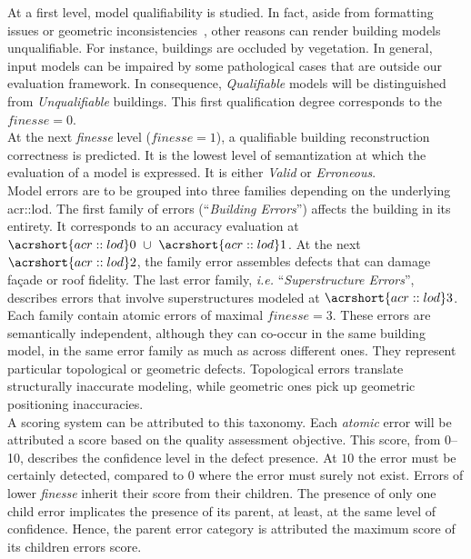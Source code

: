 \documentclass[runningheads]{llncs}
\begin{document}
At a first level, model qualifiability is studied. In fact, aside from formatting issues or geometric inconsistencies~\cite{ledoux2018val3dity}, other reasons can render building models unqualifiable. For instance, buildings are occluded by vegetation. In general, input models can be impaired by some pathological cases that are outside our evaluation framework. In consequence, \textit{Qualifiable} models will be distinguished from \textit{Unqualifiable} buildings. This first qualification degree corresponds to the $\textit{finesse} = 0$.\\

At the next \textit{finesse} level ($\textit{finesse} = 1$), a qualifiable building reconstruction correctness is predicted. It is the lowest level of semantization at which the evaluation of a model is expressed. It is either \textit{Valid} or \textit{Erroneous}.\\

Model errors are to be grouped into three families depending on the underlying \acrshort{acr::lod}. The first family of errors (``\textit{Building Errors}'') affects the building in its entirety. It corresponds to an accuracy evaluation at $\acrshort{acr::lod}0\text{ } \cup \text{ }\acrshort{acr::lod}1$. At the next $\acrshort{acr::lod}2$, the family error assembles defects that can damage fa\c{c}ade or roof fidelity. The last error family, \textit{i.e.} ``\textit{Superstructure Errors}'', describes errors that involve superstructures modeled at $\acrshort{acr::lod}3$.\\

Each family contain atomic errors of maximal $\textit{finesse} = 3$. These errors are semantically independent, although they can co-occur in the same building model, in the same error family as much as across different ones. They represent particular topological or geometric defects. Topological errors translate structurally inaccurate modeling, while geometric ones pick up geometric positioning inaccuracies.\\

A scoring system can be attributed to this taxonomy. Each \textit{atomic} error will be attributed a score based on the quality assessment objective. This score, from \SIrange{0}{10}{}, describes the confidence level in the defect presence. At $10$ the error must be certainly detected, compared to $0$ where the error must surely not exist. Errors of lower \textit{finesse} inherit their score from their children. The presence of only one child error implicates the presence of its parent, at least, at the same level of confidence. Hence, the parent error category is attributed the maximum score of its children errors score.\\
\end{document}
